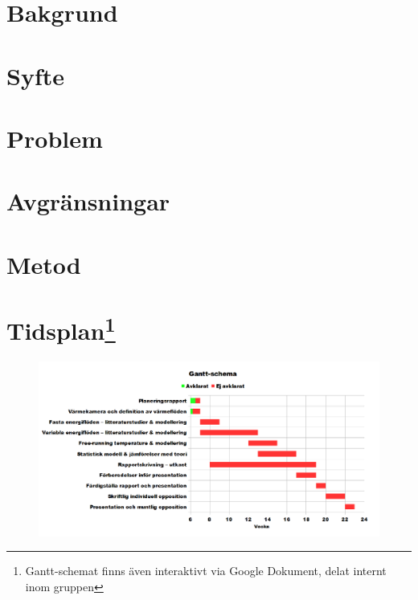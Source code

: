\documentclass[12pt,a4paper]{article}
\begin{document}
\section{Bakgrund}



\section{Syfte}



\section{Problem}



\section{Avgränsningar}



\section{Metod}



\restoregeometry

\section[Tidsplan]{Tidsplan\footnote{Gantt-schemat finns även interaktivt via Google Dokument, delat internt inom gruppen}}

\begin{figure}[h!]\centering
\includegraphics[scale=0.7, angle=270]{Gantt.png}
\end{figure}

\end{document}
